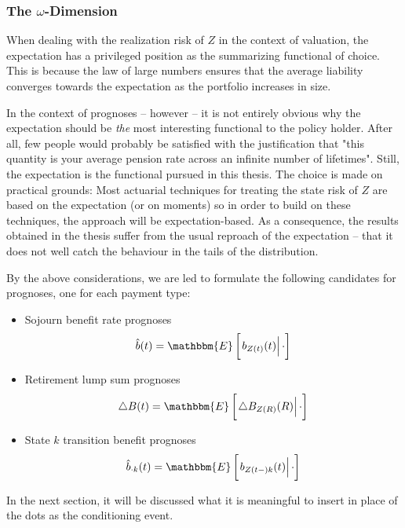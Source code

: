 \documentclass{article}
\newcommand{\1}[1]{\mathbbm{1}_{\left\lbrace #1 \right\rbrace}}
\newcommand{\econd}[2][def]{\mathbbm{E} \left[ \left. #1 \right| #2 \right]}
\theoremstyle{break}
\theoremstyle{remark}
\numberwithin{equation}{section}
\begin{document}
\subsubsection{The $\omega$-Dimension}

When dealing with the realization risk of $Z$ in the context of valuation, the expectation has a privileged position as the summarizing functional of choice. This is because the law of large numbers ensures that the average liability converges towards the expectation as the portfolio increases in size.

In the context of prognoses -- however -- it is not entirely obvious why the expectation should be \textit{the} most interesting functional to the policy holder. After all, few people would probably be satisfied with the justification that "this quantity is your average pension rate across an infinite number of lifetimes". Still, the expectation is the functional pursued in this thesis. The choice is made on practical grounds: Most actuarial techniques for treating the state risk of $Z$ are based on the expectation (or on moments) so in order to build on these techniques, the approach will be expectation-based. As a consequence, the results obtained in the thesis suffer from the usual reproach of the expectation -- that it does not well catch the behaviour in the tails of the distribution.

By the above considerations, we are led to formulate the following candidates for prognoses, one for each payment type:

\begin{itemize}
    \item Sojourn benefit rate prognoses
    \begin{align*}
        \hat{b}(t) = \econd[b_{Z(t)}(t)]{\cdot}
    \end{align*}
    \item Retirement lump sum prognoses
    \begin{align*}
        \triangle B(t) = \econd[\triangle B_{Z(R)}(R)]{\cdot}
    \end{align*}
    \item State $k$ transition benefit prognoses
    \begin{align*}
        \hat{b}_{\cdot k}(t) = \econd[b_{Z(t-)k}(t)]{\cdot}
    \end{align*}
\end{itemize}

In the next section, it will be discussed what it is meaningful to insert in place of the dots as the conditioning event.
\end{document}
